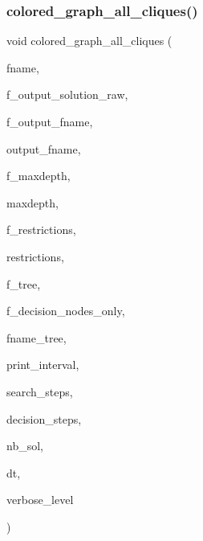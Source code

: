 \subsubsection{\texorpdfstring{colored\+\_\+graph\+\_\+all\+\_\+cliques()}{colored\_graph\_all\_cliques()}}
{\footnotesize\ttfamily void colored\+\_\+graph\+\_\+all\+\_\+cliques (\begin{DoxyParamCaption}\item[{const \mbox{\hyperlink{galois_8h_ab6cc7b4aeb6ea31aba2b3fbfc83ff5e6}{B\+Y\+TE}} $\ast$}]{fname,  }\item[{\mbox{\hyperlink{galois_8h_a09fddde158a3a20bd2dcadb609de11dc}{I\+NT}}}]{f\+\_\+output\+\_\+solution\+\_\+raw,  }\item[{\mbox{\hyperlink{galois_8h_a09fddde158a3a20bd2dcadb609de11dc}{I\+NT}}}]{f\+\_\+output\+\_\+fname,  }\item[{const \mbox{\hyperlink{galois_8h_ab6cc7b4aeb6ea31aba2b3fbfc83ff5e6}{B\+Y\+TE}} $\ast$}]{output\+\_\+fname,  }\item[{\mbox{\hyperlink{galois_8h_a09fddde158a3a20bd2dcadb609de11dc}{I\+NT}}}]{f\+\_\+maxdepth,  }\item[{\mbox{\hyperlink{galois_8h_a09fddde158a3a20bd2dcadb609de11dc}{I\+NT}}}]{maxdepth,  }\item[{\mbox{\hyperlink{galois_8h_a09fddde158a3a20bd2dcadb609de11dc}{I\+NT}}}]{f\+\_\+restrictions,  }\item[{\mbox{\hyperlink{galois_8h_a09fddde158a3a20bd2dcadb609de11dc}{I\+NT}} $\ast$}]{restrictions,  }\item[{\mbox{\hyperlink{galois_8h_a09fddde158a3a20bd2dcadb609de11dc}{I\+NT}}}]{f\+\_\+tree,  }\item[{\mbox{\hyperlink{galois_8h_a09fddde158a3a20bd2dcadb609de11dc}{I\+NT}}}]{f\+\_\+decision\+\_\+nodes\+\_\+only,  }\item[{const \mbox{\hyperlink{galois_8h_ab6cc7b4aeb6ea31aba2b3fbfc83ff5e6}{B\+Y\+TE}} $\ast$}]{fname\+\_\+tree,  }\item[{\mbox{\hyperlink{galois_8h_a09fddde158a3a20bd2dcadb609de11dc}{I\+NT}}}]{print\+\_\+interval,  }\item[{\mbox{\hyperlink{galois_8h_a09fddde158a3a20bd2dcadb609de11dc}{I\+NT}} \&}]{search\+\_\+steps,  }\item[{\mbox{\hyperlink{galois_8h_a09fddde158a3a20bd2dcadb609de11dc}{I\+NT}} \&}]{decision\+\_\+steps,  }\item[{\mbox{\hyperlink{galois_8h_a09fddde158a3a20bd2dcadb609de11dc}{I\+NT}} \&}]{nb\+\_\+sol,  }\item[{\mbox{\hyperlink{galois_8h_a09fddde158a3a20bd2dcadb609de11dc}{I\+NT}} \&}]{dt,  }\item[{\mbox{\hyperlink{galois_8h_a09fddde158a3a20bd2dcadb609de11dc}{I\+NT}}}]{verbose\+\_\+level }\end{DoxyParamCaption})}

